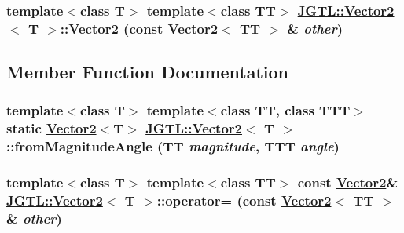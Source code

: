 \hypertarget{class_j_g_t_l_1_1_vector2_1441055d7e5df37f25501a9dc7f9b08f}{
\subsubsection[Vector2]{\setlength{\rightskip}{0pt plus 5cm}template$<$class T$>$ template$<$class TT$>$ \hyperlink{class_j_g_t_l_1_1_vector2}{JGTL::Vector2}$<$ T $>$::\hyperlink{class_j_g_t_l_1_1_vector2}{Vector2} (const \hyperlink{class_j_g_t_l_1_1_vector2}{Vector2}$<$ TT $>$ \& {\em other})}}
\label{class_j_g_t_l_1_1_vector2_1441055d7e5df37f25501a9dc7f9b08f}




\subsection{Member Function Documentation}
\hypertarget{class_j_g_t_l_1_1_vector2_c829a3c2fcfee19ba7418dafcb15fe28}{
\subsubsection[fromMagnitudeAngle]{\setlength{\rightskip}{0pt plus 5cm}template$<$class T$>$ template$<$class TT, class TTT$>$ static \hyperlink{class_j_g_t_l_1_1_vector2}{Vector2}$<$T$>$ \hyperlink{class_j_g_t_l_1_1_vector2}{JGTL::Vector2}$<$ T $>$::from\-Magnitude\-Angle (TT {\em magnitude}, TTT {\em angle})}}
\label{class_j_g_t_l_1_1_vector2_c829a3c2fcfee19ba7418dafcb15fe28}


\hypertarget{class_j_g_t_l_1_1_vector2_0595c857bb73aa35acceee677fe72d2d}{
\subsubsection[operator=]{\setlength{\rightskip}{0pt plus 5cm}template$<$class T$>$ template$<$class TT$>$ const \hyperlink{class_j_g_t_l_1_1_vector2}{Vector2}\& \hyperlink{class_j_g_t_l_1_1_vector2}{JGTL::Vector2}$<$ T $>$::operator= (const \hyperlink{class_j_g_t_l_1_1_vector2}{Vector2}$<$ TT $>$ \& {\em other})}}
\label{class_j_g_t_l_1_1_vector2_0595c857bb73aa35acceee677fe72d2d}


